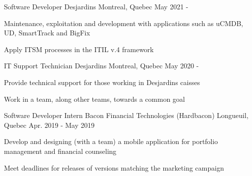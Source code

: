 

\begin{cventries}

  
  \cventry
    {Software Developer} %
    {Desjardins} %
    {Montreal, Quebec} %
    {May 2021 -} %
    {
      \begin{cvitems} %
        \item {Maintenance, exploitation and development with applications such as uCMDB, UD, SmartTrack and BigFix}
        \item {Apply ITSM processes in the ITIL v.4 framework}
      \end{cvitems}
    }
    
  \cventry
    {IT Support Technician} %
    {Desjardins} %
    {Montreal, Quebec} %
    {May 2020 - } %
    {
      \begin{cvitems} %
        \item {Provide technical support for those working in Desjardins caisses}
        \item {Work in a team, along other teams, towards a common goal}
      \end{cvitems}
    }
    
  \cventry
    {Software Developer Intern} %
    {Bacon Financial Technologies (Hardbacon)} %
    {Longueuil, Quebec} %
    {Apr. 2019 - May 2019} %
    {
      \begin{cvitems} %
        \item {Develop and designing (with a team) a mobile application for portfolio management and financial counseling}
        \item {Meet deadlines for releases of versions matching the marketing campaign}
      \end{cvitems}
    }

\end{cventries}

